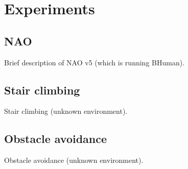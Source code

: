 \chapter{Experiments}
\label{ch:experiments}
\section{NAO}
Brief description of NAO v5 (which is running BHuman).

\section{Stair climbing}
Stair climbing (unknown environment).

\section{Obstacle avoidance}
Obstacle avoidance (unknown environment).

